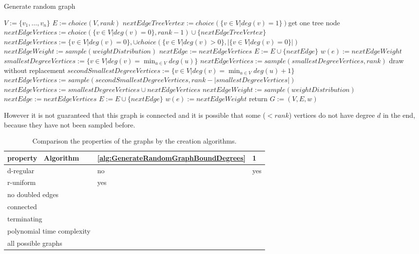 \begin{algorithm}[htpb]
	\caption{Generate random graph} 
	\begin{algorithmic}
		\State $V := \{v_1, \ldots, v_n\}$
		\State $E := choice(V,rank)$
			\State $nextEdgeTreeVertex := choice(\{v\in V| deg(v) = 1 \})$\Comment get one tree node
			\State $nextEdgeVertices := choice(\{v\in V| deg(v) =0\}, rank-1) \cup \{nextEdgeTreeVertex\}$
			\Else
			\State  $nextEdgeVertices :=  \{v\in V| deg(v) =0\},  \cup choice(\{v\in V| deg(v) >0\},| \{v\in V| deg(v) =0\}| ) $
			\EndIf
			\State $nextEdgeWeight := sample(weightDistribution)$ 
			\State $nextEdge := nextEdgeVertices$
			\State $E := E \cup \{nextEdge\}$
			\State $w(e):= nextEdgeWeight$
			\EndWhile
			\State $ smallestDegreeVertices := \{v\in V| deg(v) = \min_{u\in V} deg(u) \}$
			\State $nextEdgeVertices := sample(smallestDegreeVertices, rank) $ \Comment draw without replacement
			\Else
			\State $secondSmallestDegreeVertices := \{v\in V| deg(v) = \min_{u\in V} deg(u) +1 \}$
			\State $nextEdgeVertices :=  sample(secondSmallestDegreeVertices, rank - | smallestDegreeVertices|)$
			\State $nextEdgeVertices := smallestDegreeVertices \cup nextEdgeVertices  $
			\EndIf
			\State $nextEdgeWeight := sample(weightDistribution)$ 
			\State $nextEdge := nextEdgeVertices$
			\State $E := E \cup \{nextEdge\}$
			\State $w(e):= nextEdgeWeight$
			\EndWhile
			\State return $G:=(V,E, w)$	
			\EndFunction 
	\end{algorithmic}
\end{algorithm}	
	
However it is not guaranteed that this graph is connected and it is possible that some ($< rank$) vertices do not have degree $d$ in the end, because they have not been sampled before.


\begin{table}[htpb]
  \caption[Graph creation algorithms comparison]{Comparison the properties of the graphs by the creation algorithms.}\label{tab:GraphCreationAlgorithmsComparison}
  \centering
  \begin{tabular}{l| l|l}
    
      property \ Algorithm & \ref{alg:GenerateRandomGraphBoundDegrees}& 1  \\
    \midrule
      d-regular &no & yes\\
      r-uniform & yes\\
     no doubled edges & \\
     	connected &\\
     	terminating &\\
     	polynomial time complexity&\\
     	 all possible graphs &&\\
  \end{tabular}
\end{table}

